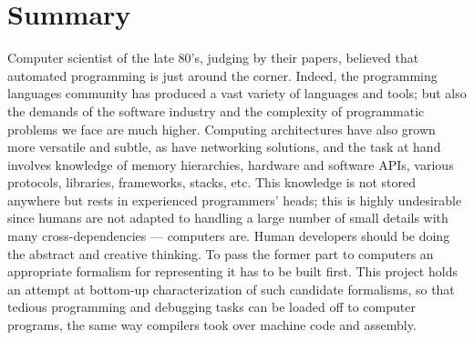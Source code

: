 \section{Summary}

Computer scientist of the late 80's, judging by their papers, believed that
automated programming is just around the corner.
Indeed, the programming languages community has produced a vast variety of
languages and tools; but also the demands of the software industry and the
complexity of programmatic problems we face are much higher.
Computing architectures have also grown more versatile and subtle, as have
networking solutions, and the task at hand involves knowledge of memory
hierarchies, hardware and software APIs, various protocols, libraries,
frameworks, stacks, etc.
This knowledge is not stored anywhere but rests in experienced programmers'
heads; this is highly undesirable since humans are not adapted to handling
a large number of small details with many cross-dependencies --- computers
are. Human developers should be doing the abstract and creative thinking.
To pass the former part to computers an appropriate formalism for representing
it has to be built first.
This project holds an attempt at bottom-up characterization of such candidate
formalisms, so that tedious programming and debugging tasks can be loaded
off to computer programs, the same way compilers took over machine code
and assembly.
